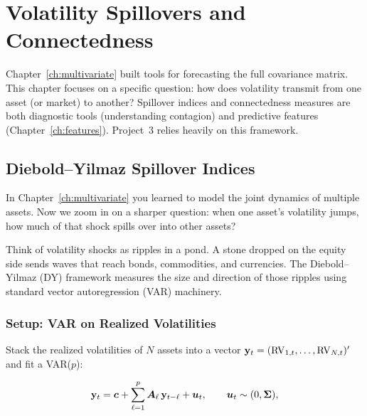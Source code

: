 
\chapter{Volatility Spillovers and Connectedness}\label{ch:spillovers}

\begin{application}
Chapter~\ref{ch:multivariate} built tools for forecasting the full covariance matrix.
This chapter focuses on a specific question: how does volatility transmit from one
asset (or market) to another?  Spillover indices and connectedness measures are both
diagnostic tools (understanding contagion) and predictive features
(Chapter~\ref{ch:features}).  Project~3 relies heavily on this framework.
\end{application}

\section{Diebold--Yilmaz Spillover Indices}\label{sec:dy-spillover}

In Chapter~\ref{ch:multivariate} you learned to model the joint dynamics of multiple
assets.  Now we zoom in on a sharper question: when one asset's volatility jumps,
how much of that shock spills over into other assets?

\begin{intuition}
Think of volatility shocks as ripples in a pond.  A stone dropped on the equity
side sends waves that reach bonds, commodities, and currencies.  The Diebold--Yilmaz
(DY) framework measures the size and direction of those ripples using standard
vector autoregression (VAR) machinery.
\end{intuition}

\subsection{Setup: VAR on Realized Volatilities}

Stack the realized volatilities of $N$ assets into a vector
$\mathbf{y}_t = (\operatorname{RV}_{1,t}, \ldots, \operatorname{RV}_{N,t})'$ and fit a VAR($p$):

\begin{equation}\label{eq:var-rv}
  \mathbf{y}_t = \bm{c} + \sum_{\ell=1}^{p} \bm{A}_\ell \, \mathbf{y}_{t-\ell} + \bm{u}_t,
  \qquad \bm{u}_t \sim (0, \bm{\Sigma}),
\end{equation}

